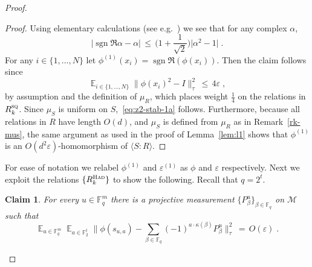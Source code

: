 \documentclass[11pt]{article}
\newtheorem{claim}[theorem]{Claim}
\theoremstyle{definition}
\newcommand{\Id}{\ensuremath{I}}
\DeclareMathOperator*{\Expectation}{\mathbb{E}}
\newcommand{\Es}[1]{\Expectation_{#1}}
\newcommand{\F}{\ensuremath{\mathbb{F}}}
\newcommand{\sq}{\textsc{sq}}
\newcommand{\mM}{\ensuremath{\mathcal{M}}}
\newcommand{\had}{\textsc{Had}}
\newcommand{\eps}{\varepsilon}
\DeclareMathOperator{\sgn}{sgn}
\begin{document}
\begin{proof}
\begin{proof}
Using elementary calculations (see e.g.~\cite[Lemma 3.6]{slofstra2019set}) we see that for any complex $\alpha$, 
\[ \big| \sgn\Re\alpha-\alpha\big| \,\leq\, \Big(1+\frac{1}{\sqrt{2}}\Big) \big|\alpha^2 -1 \big|\;.\]
For any $i\in \{1,\ldots,N\}$ let $\phi^{(1)}(x_i) = \sgn\Re (\phi(x_i))$. Then the claim follows since 
\[ \Es{i\in\{1,\ldots,N\}} \big\| \phi(x_i)^2-\Id \big\|_\tau^2 \,\leq\, 4\eps\;,\]
by assumption and the definition of $\mu_R$, which places weight $\frac{1}{4}$ on the relations in $R_k^\sq$. Since $\mu_S$ is uniform on $S$,~\eqref{eq:z2-stab-1a} follows. Furthermore, 
because all relations in $R$ have length $O(d)$, and $\mu_S$ is defined from $\mu_R$ as in Remark~\ref{rk-mus}, the same argument as used in the proof of Lemma~\ref{lem:l1} shows that $\phi^{(1)}$ is an $O(d^2\eps)$-homomorphism of $\langle S:R\rangle$.
\end{proof}

For ease of notation we relabel $\phi^{(1)}$ and $\eps^{(1)}$ as $\phi$ and $\eps$ respectively. Next we exploit the relations $\{R^\had_k\}$ to show the following. Recall that $q=2^t$.

\begin{claim}\label{claim:z2-stab-2}
For every $u\in \F_q^m$ there is a projective measurement $\{P^u_\beta\}_{\beta\in \F_{q}}$ on $\mM$ such that 
\begin{equation}\label{eq:z2-stab-2}
 \Es{u\in \F_q^m} \Es{a\in \F_2^t} \Big\| \phi(s_{u,a}) - \sum_{\beta\in\F_q} (-1)^{a \cdot \kappa(\beta)} P^u_\beta \Big\|_\tau^2 \,=\, O(\eps)\;. 
\end{equation}
\end{claim}


\end{proof}
\end{document}
